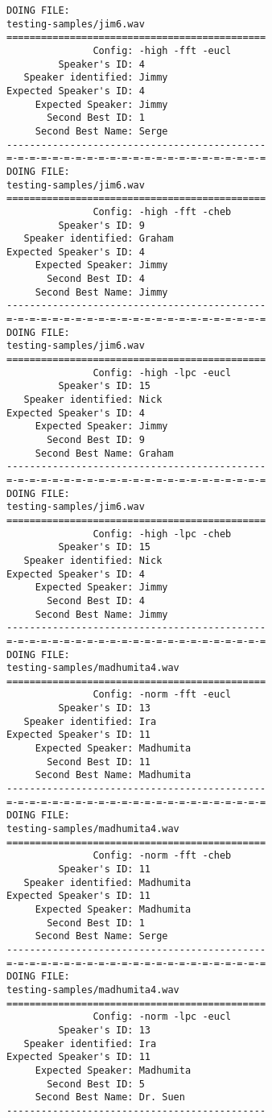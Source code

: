 \begin{verbatim}
DOING FILE:
testing-samples/jim6.wav
=============================================
               Config: -high -fft -eucl
         Speaker's ID: 4
   Speaker identified: Jimmy
Expected Speaker's ID: 4
     Expected Speaker: Jimmy
       Second Best ID: 1
     Second Best Name: Serge
---------------------------------------------
=-=-=-=-=-=-=-=-=-=-=-=-=-=-=-=-=-=-=-=-=-=-=
DOING FILE:
testing-samples/jim6.wav
=============================================
               Config: -high -fft -cheb
         Speaker's ID: 9
   Speaker identified: Graham
Expected Speaker's ID: 4
     Expected Speaker: Jimmy
       Second Best ID: 4
     Second Best Name: Jimmy
---------------------------------------------
=-=-=-=-=-=-=-=-=-=-=-=-=-=-=-=-=-=-=-=-=-=-=
DOING FILE:
testing-samples/jim6.wav
=============================================
               Config: -high -lpc -eucl
         Speaker's ID: 15
   Speaker identified: Nick
Expected Speaker's ID: 4
     Expected Speaker: Jimmy
       Second Best ID: 9
     Second Best Name: Graham
---------------------------------------------
=-=-=-=-=-=-=-=-=-=-=-=-=-=-=-=-=-=-=-=-=-=-=
DOING FILE:
testing-samples/jim6.wav
=============================================
               Config: -high -lpc -cheb
         Speaker's ID: 15
   Speaker identified: Nick
Expected Speaker's ID: 4
     Expected Speaker: Jimmy
       Second Best ID: 4
     Second Best Name: Jimmy
---------------------------------------------
=-=-=-=-=-=-=-=-=-=-=-=-=-=-=-=-=-=-=-=-=-=-=
DOING FILE:
testing-samples/madhumita4.wav
=============================================
               Config: -norm -fft -eucl
         Speaker's ID: 13
   Speaker identified: Ira
Expected Speaker's ID: 11
     Expected Speaker: Madhumita
       Second Best ID: 11
     Second Best Name: Madhumita
---------------------------------------------
=-=-=-=-=-=-=-=-=-=-=-=-=-=-=-=-=-=-=-=-=-=-=
DOING FILE:
testing-samples/madhumita4.wav
=============================================
               Config: -norm -fft -cheb
         Speaker's ID: 11
   Speaker identified: Madhumita
Expected Speaker's ID: 11
     Expected Speaker: Madhumita
       Second Best ID: 1
     Second Best Name: Serge
---------------------------------------------
=-=-=-=-=-=-=-=-=-=-=-=-=-=-=-=-=-=-=-=-=-=-=
DOING FILE:
testing-samples/madhumita4.wav
=============================================
               Config: -norm -lpc -eucl
         Speaker's ID: 13
   Speaker identified: Ira
Expected Speaker's ID: 11
     Expected Speaker: Madhumita
       Second Best ID: 5
     Second Best Name: Dr. Suen
---------------------------------------------

\end{verbatim}
